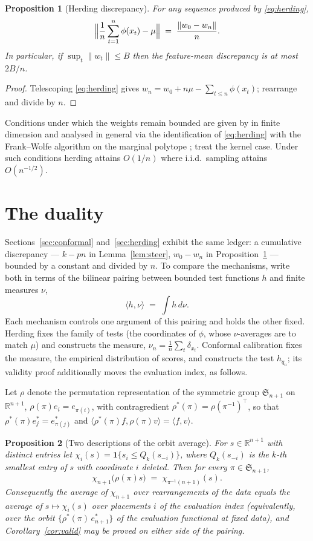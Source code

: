 \documentclass[11pt]{article}
\newtheorem{proposition}{Proposition}
\theoremstyle{remark}
\newcommand{\R}{\mathbb{R}}
\newcommand{\ind}[1]{\mathbf 1\{#1\}}
\begin{document}
\begin{proposition}[Herding discrepancy]\label{prop:herd}
For any sequence produced by \eqref{eq:herding},
\[
\Bigl\|\frac1n\sum_{t=1}^{n}\phi(x_t)-\mu\Bigr\|\;=\;\frac{\|w_0-w_n\|}{n}.
\]
In particular, if $\sup_t\|w_t\|\le B$ then the feature-mean discrepancy is at most $2B/n$.
\end{proposition}

\begin{proof}
Telescoping \eqref{eq:herding} gives $w_n=w_0+n\mu-\sum_{t\le n}\phi(x_t)$; rearrange and divide
by $n$.
\end{proof}

Conditions under which the weights remain bounded are given by \citet{welling2009} in finite
dimension and analysed in general via the identification of \eqref{eq:herding} with the
Frank--Wolfe algorithm on the marginal polytope \citep{bach2012}; \citet{chen2010} treat the
kernel case. Under such conditions herding attains $O(1/n)$ where i.i.d.\ sampling attains
$O(n^{-1/2})$.

\section{The duality}\label{sec:duality}

Sections~\ref{sec:conformal} and~\ref{sec:herding} exhibit the same ledger: a cumulative
discrepancy --- $k-pn$ in Lemma~\ref{lem:steer}, $w_0-w_n$ in Proposition~\ref{prop:herd} ---
bounded by a constant and divided by $n$. To compare the mechanisms, write both in terms of the
bilinear pairing between bounded test functions $h$ and finite measures $\nu$,
\[
\langle h,\nu\rangle\;=\;\int h\,d\nu .
\]
Each mechanism controls one argument of this pairing and holds the other fixed. Herding fixes the
family of tests (the coordinates of $\phi$, whose $\nu$-averages are to match $\mu$) and
constructs the measure, $\nu_n=\frac1n\sum_t\delta_{x_t}$. Conformal calibration fixes the measure, the empirical distribution of scores, and constructs the test $h_{q_n}$; its
validity proof additionally moves the evaluation index, as follows.

Let $\rho$ denote the permutation representation of the symmetric group $\mathfrak S_{n+1}$ on
$\R^{n+1}$, $\rho(\pi)e_i=e_{\pi(i)}$, with contragredient
$\rho^{*}(\pi)=\rho(\pi^{-1})^{\top}$, so that $\rho^{*}(\pi)e^{*}_{j}=e^{*}_{\pi(j)}$ and
$\langle\rho^{*}(\pi)f,\rho(\pi)v\rangle=\langle f,v\rangle$.

\begin{proposition}[Two descriptions of the orbit average]\label{prop:dual}
For $s\in\R^{n+1}$ with distinct entries let
$\chi_i(s)=\ind{s_i\le Q_k(s_{-i})}$, where $Q_k(s_{-i})$ is the $k$-th smallest entry of $s$ with
coordinate $i$ deleted. Then for every $\pi\in\mathfrak S_{n+1}$,
\[
\chi_{n+1}\bigl(\rho(\pi)s\bigr)\;=\;\chi_{\pi^{-1}(n+1)}(s).
\]
Consequently the average of $\chi_{n+1}$ over rearrangements of the data equals the average of
$s\mapsto\chi_i(s)$ over placements $i$ of the evaluation index (equivalently, over the orbit $\{\rho^{*}(\pi)\,e^{*}_{n+1}\}$ of the evaluation functional at fixed data), and
Corollary~\ref{cor:valid} may be proved on either side of the pairing.
\end{proposition}
\end{document}
